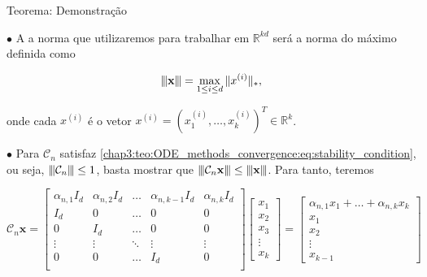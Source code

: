 \documentclass{beamer}
\newcommand{\vertiii}[1]{{\left\vert\kern-0.25ex\left\vert\kern-0.25ex\left\vert #1 
    \right\vert\kern-0.25ex\right\vert\kern-0.25ex\right\vert}}
\newcommand{\R}{\mathbb{R}}
\theoremstyle{plain}
\theoremstyle{definition}
\begin{document}

\begin{frame}{Teorema: Demonstração}


    \phantom{aa} $\bullet$ A a norma que utilizaremos para trabalhar em $\R^{kd}$ será a norma do máximo definida como
    
    \begin{equation}
      \vertiii{\mathbf{x}} = \max_{1 \leq i \leq d} \|x^{(i)}\|_* ,
      \label{chap3:teo:ODE_methods_convergence:eq:norm}
    \end{equation}
 
    \noindent
    onde cada \(x^{(i)}\) é o vetor $x^{(i)} = (x_1 ^{(i)}, \dots, x_k ^{(i)})^T \in \R^k$.


    \phantom{aa} $\bullet$ Para  $\mathcal{C}_n$ satisfaz \eqref{chap3:teo:ODE_methods_convergence:eq:stability_condition}, ou seja,  $\vertiii{\mathcal{C}_n} \leq 1$, basta mostrar que $\vertiii{ \mathcal{C}_n \mathbf{x}} \leq \vertiii{\mathbf{x}}$. Para tanto, teremos



    \scriptsize
    \[
      \mathcal{C}_{n} \mathbf{x}  = 
      \begin{bmatrix}
        \alpha_{n,1} I_d & \alpha_{n,2} I_d & \dots & \alpha_{n, k-1} I_d & \alpha_{n, k} I_d \\
        I_d & 0 & \dots & 0 & 0 \\
        0 & I_d & \dots & 0 & 0 \\
        \vdots & \vdots & \ddots & \vdots & \vdots \\
        0 & 0 & \dots & I_d & 0 \\
      \end{bmatrix}
      \begin{bmatrix}
        x_1 \\
        x_2 \\
        x_3 \\
        \vdots \\
        x_k
      \end{bmatrix} =
      \begin{bmatrix}
        \alpha_{n,1}x_1 + \dots + \alpha_{n, k} x_k \\
        x_1 \\
        x_2 \\
        \vdots \\
        x_{k-1}
      \end{bmatrix}
    \]

\end{frame}
\end{document}
